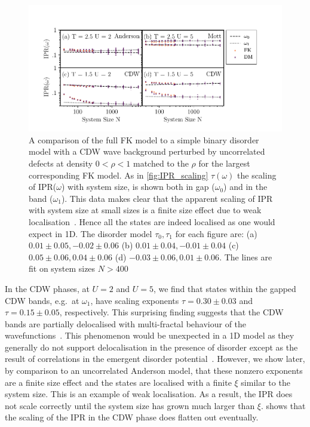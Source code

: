 \hypertarget{fig:DM_IPR_scaling}{%
\begin{figure}
\centering
\includegraphics[width=1\textwidth,height=\textheight]{figure_code/fk_chapter/disorder_model/DM_IPR_scaling}
\caption[{FK model compared to binary disorder model: IPR Scaling}]{A comparison of the full FK model to a simple binary disorder model with a CDW wave background perturbed by uncorrelated defects at density \(0 < \rho < 1\) matched to the \(\rho\) for the largest corresponding FK model. As in \cref{fig:IPR_scaling} \(\tau(\omega)\) the scaling of IPR(\(\omega\)) with system size, is shown both in gap (\(\omega_0\)) and in the band (\(\omega_1\)). This data makes clear that the apparent scaling of IPR with system size at small sizes is a finite size effect due to weak localisation~\autocite{antipovInteractionTunedAndersonMott2016}. Hence all the states are indeed localised as one would expect in 1D. The disorder model \(\tau_0,\tau_1\) for each figure are: (a) \(0.01\pm0.05, -0.02\pm0.06\) (b) \(0.01\pm0.04, -0.01\pm0.04\) (c) \(0.05\pm0.06, 0.04\pm0.06\) (d) \(-0.03\pm0.06, 0.01\pm0.06\). The lines are fit on system sizes \(N > 400\)}
\label{fig:DM_IPR_scaling}
\end{figure}
}

In the CDW phases, at \(U=2\) and \(U=5\), we find that states within the gapped CDW bands, e.g.~at \(\omega_1\), have scaling exponents \(\tau = 0.30\pm0.03\) and \(\tau = 0.15\pm0.05\), respectively. This surprising finding suggests that the CDW bands are partially delocalised with multi-fractal behaviour of the wavefunctions~\autocite{eversAndersonTransitions2008}. This phenomenon would be unexpected in a 1D model as they generally do not support delocalisation in the presence of disorder except as the result of correlations in the emergent disorder potential~\autocite{croyAndersonLocalization1D2011,goldshteinPurePointSpectrum1977}. However, we show later, by comparison to an uncorrelated Anderson model, that these nonzero exponents are a finite size effect and the states are localised with a finite \(\xi\) similar to the system size. This is an example of weak localisation. As a result, the IPR does not scale correctly until the system size has grown much larger than \(\xi\).  shows that the scaling of the IPR in the CDW phase does flatten out eventually.

